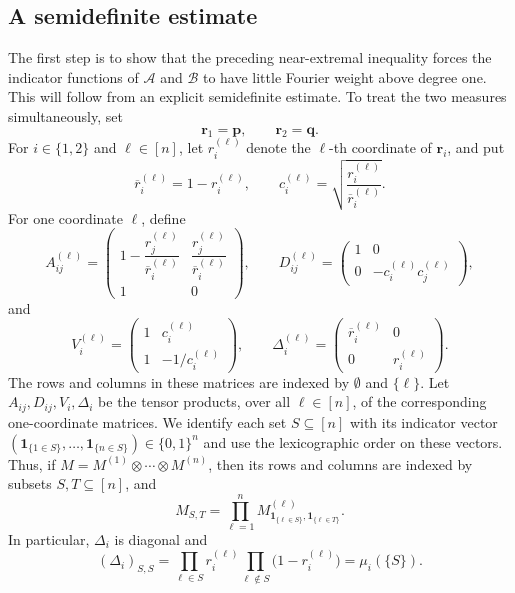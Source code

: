 \documentclass[11pt]{article}
\numberwithin{equation}{section}
\theoremstyle{definition}
\theoremstyle{remark}
\begin{document}
\subsection{A semidefinite estimate}
\label{sec:semidefinite-estimate}

The first step is to show that the preceding near-extremal inequality
forces the indicator functions of
$\mathcal A$ and $\mathcal B$ to have little Fourier weight above
degree one.  This will follow from an explicit semidefinite
estimate.
To treat the two measures simultaneously, set
$$
 \mathbf r_1=\mathbf p,\qquad
 \mathbf r_2=\mathbf q.
$$
For $i\in\{1,2\}$ and $\ell\in[n]$, let
$r_i^{(\ell)}$ denote the $\ell$-th coordinate of $\mathbf r_i$,
and put
$$
 \overline r_i^{(\ell)}=1-r_i^{(\ell)},
 \qquad
 c_i^{(\ell)}
 =
 \sqrt{\frac{r_i^{(\ell)}}{\overline r_i^{(\ell)}}}.
$$
For one coordinate $\ell$, define
$$
 A_{ij}^{(\ell)}
 =
 \begin{pmatrix}
  1-\dfrac{r_j^{(\ell)}}{\overline r_i^{(\ell)}}&
  \dfrac{r_j^{(\ell)}}{\overline r_i^{(\ell)}}\\[5pt]
  1&0
 \end{pmatrix},
 \qquad
 D_{ij}^{(\ell)}
 =
 \begin{pmatrix}
  1&0\\
  0&-c_i^{(\ell)}c_j^{(\ell)}
 \end{pmatrix},
$$
and
$$
 V_i^{(\ell)}
 =
 \begin{pmatrix}
  1&c_i^{(\ell)}\\[2pt]
  1&-1/c_i^{(\ell)}
 \end{pmatrix},
 \qquad
 \Delta_i^{(\ell)}
 =
 \begin{pmatrix}
  \overline r_i^{(\ell)}&0\\
  0&r_i^{(\ell)}
 \end{pmatrix}.
$$
The rows and columns in these matrices are indexed by
$\emptyset$ and $\{\ell\}$.   Let
$A_{ij},D_{ij},V_i,\Delta_i$ be the tensor products, over all
$\ell\in[n]$, of the corresponding one-coordinate matrices.
We identify each set $S\subseteq[n]$ with its indicator vector
$(\mathbf 1_{\{1\in S\}},\ldots,\mathbf 1_{\{n\in S\}})\in\{0,1\}^n$
and use the lexicographic order on these vectors. Thus, if
$M=M^{(1)}\otimes\cdots\otimes M^{(n)}$, then its rows and columns
are indexed by subsets $S,T\subseteq[n]$, and
$$
 M_{S,T}
 =
 \prod_{\ell=1}^n
 M^{(\ell)}_{\mathbf 1_{\{\ell\in S\}},
                 \mathbf 1_{\{\ell\in T\}}}.
$$
In particular, $\Delta_i$ is diagonal and
$$
 (\Delta_i)_{S,S}
 =
 \prod_{\ell\in S}r_i^{(\ell)}
 \prod_{\ell\notin S}\bigl(1-r_i^{(\ell)}\bigr)
 =
 \mu_i(\{S\}).
$$
\end{document}
